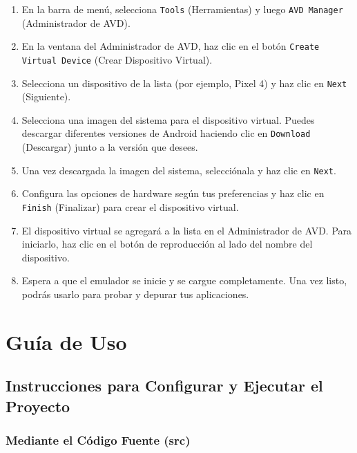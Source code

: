 \documentclass{article}
\begin{document}
\begin{itemize}
            \begin{enumerate}
                \item En la barra de menú, selecciona \texttt{Tools} (Herramientas) y luego \texttt{AVD Manager} (Administrador de AVD).
                \item En la ventana del Administrador de AVD, haz clic en el botón \texttt{Create Virtual Device} (Crear Dispositivo Virtual).
                \item Selecciona un dispositivo de la lista (por ejemplo, Pixel 4) y haz clic en \texttt{Next} (Siguiente).
                \item Selecciona una imagen del sistema para el dispositivo virtual. Puedes descargar diferentes versiones de Android haciendo clic en \texttt{Download} (Descargar) junto a la versión que desees.
                \item Una vez descargada la imagen del sistema, selecciónala y haz clic en \texttt{Next}.
                \item Configura las opciones de hardware según tus preferencias y haz clic en \texttt{Finish} (Finalizar) para crear el dispositivo virtual.
                \item El dispositivo virtual se agregará a la lista en el Administrador de AVD. Para iniciarlo, haz clic en el botón de reproducción al lado del nombre del dispositivo.
                \item Espera a que el emulador se inicie y se cargue completamente. Una vez listo, podrás usarlo para probar y depurar tus aplicaciones.
            \end{enumerate}
    
    \end{itemize}

\section{Guía de Uso}
    \subsection{Instrucciones para Configurar y Ejecutar el Proyecto}

    \subsubsection{Mediante el Código Fuente (src)}
\end{document}
